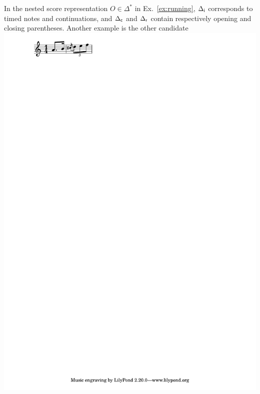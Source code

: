 \begin{example}\label{ex:nested-word}
In the nested score representation $O \in \Delta^*$ in Ex.~\ref{ex:running},
${\Delta_\mathsf{i}}$ corresponds to timed notes and continuations,
and ${\Delta_\mathsf{c}}$ and ${\Delta_\mathsf{r}}$ contain respectively opening and closing parentheses.
Another example is the other candidate
\includegraphics[scale=0.35,trim=0 5mm 0 0]{pictures/ex2.pdf}

\end{example}
